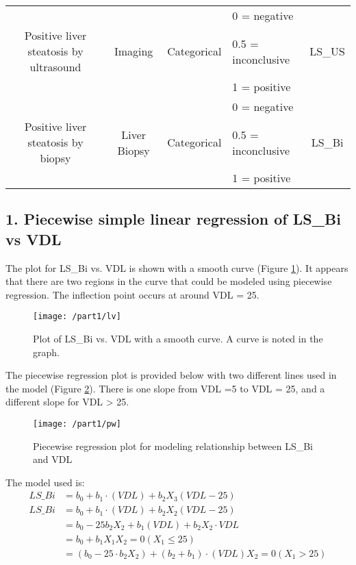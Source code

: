 \documentclass{article}
\begin{document}
\begin{minipage}{\textwidth}
{\begin{tabular}{c | c | c | l | c }
& & & 0 = negative & \\
\cline{4-4}
Positive liver steatosis by ultrasound &Imaging &Categorical & 0.5 = inconclusive & LS\_US\\
\cline{4-4}
& & & 1 = positive & \\
\hline

& & & 0 = negative & \\
\cline{4-4}
Positive liver steatosis by biopsy &Liver Biopsy &Categorical & 0.5 = inconclusive & LS\_Bi\\
\cline{4-4}
& & & 1 = positive & \\ 
\hline

\end{tabular}
}
\end{minipage} \hfill

\subsection{1. Piecewise simple linear regression of LS\_Bi vs VDL}

The plot for LS\_Bi vs. VDL is shown with a smooth curve (Figure \ref{lv}). It appears that there are two regions in the curve that could be modeled using piecewise regression. The inflection point occurs at around VDL = 25. \\
\begin{minipage}{\textwidth}		
\begin{figure}[H]
\centering
\texttt{[image: /part1/lv]}
\caption{Plot of LS\_Bi vs. VDL with a smooth curve. A curve is noted in the graph.}
\label{lv}
\end{figure}
\end{minipage} \hfill

The piecewise regression plot is provided below with two different lines used in the model (Figure \ref{pw}). There is one slope from VDL =5 to VDL = 25, and a different slope for VDL > 25.\\
\begin{minipage}{\textwidth}		
\begin{figure}[H]
\centering
\texttt{[image: /part1/pw]}
\caption{Piecewise regression plot for modeling relationship between LS\_Bi and VDL}
\label{pw}
\end{figure}
\end{minipage} \hfill

The model used is:
\begin{align*}
LS\_Bi &= b_0 + b_1\cdot(VDL)+b_2X_3(VDL-25)\\
LS\_Bi &= b_0 + b_1\cdot (VDL)+b_2X_2(VDL-25)\\
&= b_0 -25b_2X_2 + b_1(VDL) + b_2X_2 \cdot VDL \\
&= {b_0 + b_1X_1 	X_2 = 0 (X_1 \leq 25)} \\
&= {(b_0 -25\cdot b_2X_2) + (b_2 + b_1)\cdot (VDL)	X_2 = 0  (X_1 > 25)}
\end{align*}
\end{document}
